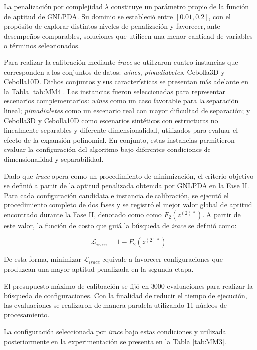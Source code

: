 La penalización por complejidad $\lambda$ constituye un parámetro propio de la función de aptitud de GNLPDA. Su dominio se estableció entre $[0.01,0.2]$, con el propósito de explorar distintos niveles de penalización y favorecer, ante desempeños comparables, soluciones que utilicen una menor cantidad de variables o términos seleccionados.

Para realizar la calibración mediante \textit{irace} se utilizaron cuatro instancias que corresponden a los conjuntos de datos: \textit{wines}, \textit{pimadiabetes}, Cebolla3D y Cebolla10D. Dichos conjuntos y sus características se presentan más adelante en la Tabla \ref{tab:MM4}. Las instancias fueron seleccionadas para representar escenarios complementarios: 
\textit{wines} como un caso favorable para la separación lineal; \textit{pimadiabetes} como un escenario real con mayor dificultad de separación; y Cebolla3D y Cebolla10D como escenarios sintéticos con estructuras no linealmente separables y diferente dimensionalidad, utilizados para evaluar el efecto de la expansión polinomial. En conjunto, estas instancias permitieron evaluar la configuración del algoritmo bajo diferentes condiciones de dimensionalidad y separabilidad.

Dado que  \textit{irace} opera como un procedimiento de minimización, el criterio objetivo se definió a partir de la aptitud penalizada obtenida por GNLPDA en la Fase II. Para cada configuración candidata e instancia de calibración, se ejecutó el procedimiento completo de dos fases y se registró el mejor valor global de aptitud encontrado durante la Fase II, denotado como como $F_2{(z^{(2)*})}$. A partir de este valor, la función de costo que guiá la búsqueda de \textit{irace} se definió como:

\begin{equation}
	\mathcal{L}_{irace} = 1-F_2{(z^{(2)*})}
	\label{eq:EM14}
\end{equation}

De esta forma, minimizar $\mathcal{L}_{irace}$ equivale a favorecer configuraciones que produzcan una mayor aptitud penalizada en la segunda etapa.

El presupuesto máximo de calibración se fijó en 3000 evaluaciones para realizar la búsqueda de configuraciones. Con la finalidad de reducir el tiempo de ejecución, las evaluaciones se realizaron de manera paralela utilizando 11 núcleos de procesamiento.


La configuración seleccionada por \textit{irace} bajo estas condiciones y utilizada posteriormente en la experimentación se presenta en la Tabla \ref{tab:MM3}.



